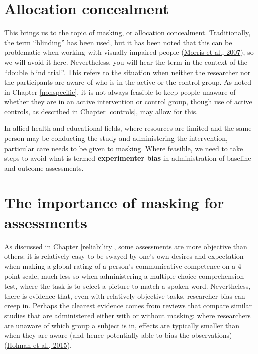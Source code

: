 \documentclass{krantz}
\begin{document}
\hypertarget{allocation-concealment}{%
\section{Allocation concealment}\label{allocation-concealment}}

This brings us to the topic of masking, or allocation concealment. Traditionally, the term ``blinding'' has been used, but it has been noted that this can be problematic when working with visually impaired people (\protect\hyperlink{ref-morris2007}{Morris et al., 2007}), so we will avoid it here. Nevertheless, you will hear the term in the context of the ``double blind trial''. This refers to the situation when neither the researcher nor the participants are aware of who is in the active or the control group. As noted in Chapter \ref{nonspecific}, it is not always feasible to keep people unaware of whether they are in an active intervention or control group, though use of active controls, as described in Chapter \ref{controls}, may allow for this.

In allied health and educational fields, where resources are limited and the same person may be conducting the study and administering the intervention, particular care needs to be given to masking. Where feasible, we need to take steps to avoid what is termed \textbf{experimenter bias} in administration of baseline and outcome assessments.

\hypertarget{the-importance-of-masking-for-assessments}{%
\section{The importance of masking for assessments}\label{the-importance-of-masking-for-assessments}}

As discussed in Chapter \ref{reliability}, some assessments are more objective than others: it is relatively easy to be swayed by one's own desires and expectation when making a global rating of a person's communicative competence on a 4-point scale, much less so when administering a multiple choice comprehension test, where the task is to select a picture to match a spoken word. Nevertheless, there is evidence that, even with relatively objective tasks, researcher bias can creep in. Perhaps the clearest evidence comes from reviews that compare similar studies that are administered either with or without masking: where researchers are unaware of which group a subject is in, effects are typically smaller than when they are aware (and hence potentially able to bias the observations) (\protect\hyperlink{ref-holman2015}{Holman et al., 2015}).
\end{document}
